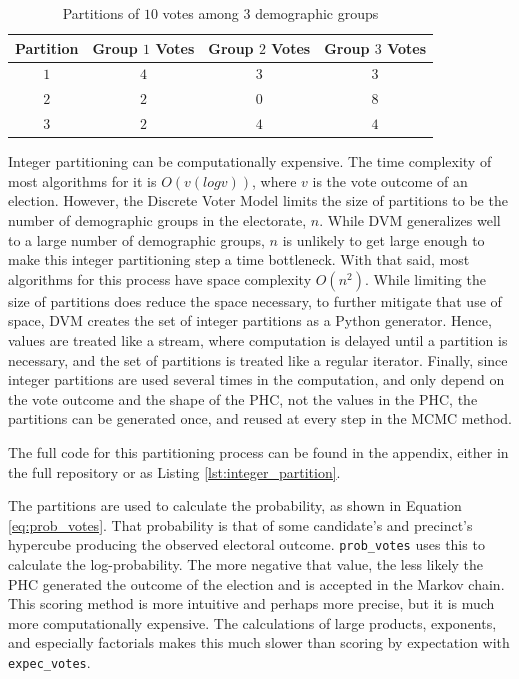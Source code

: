 \begin{table}[!h]
 \centering
 \caption{Partitions of $10$ votes among $3$ demographic groups}
 \label{table:partitions}
 \begin{tabular}{|c|c|c|c|}
   \toprule
    Partition & Group $1$ Votes & Group $2$ Votes & Group $3$ Votes \\\midrule
    $1$ & $4$ & $3$ & $3$  \\
    $2$ & $2$ & $0$ & $8$  \\
    $3$ & $2$ & $4$ & $4$  \\
    \bottomrule
 \end{tabular}
\end{table}

Integer partitioning can be computationally expensive. The time complexity of most algorithms for it is $O(v (log v))$, where $v$ is the vote outcome of an election. However, the Discrete Voter Model limits the size of partitions to be the number of demographic groups in the electorate, $n$. While DVM generalizes well to a large number of demographic groups, $n$ is unlikely to get large enough to make this integer partitioning step a time bottleneck. With that said, most algorithms for this process have space complexity $O(n^2)$. While limiting the size of partitions does reduce the space necessary, to further mitigate that use of space, DVM creates the set of integer partitions as a Python generator. Hence, values are treated like a stream, where computation is delayed until a partition is necessary, and the set of partitions is treated like a regular iterator. Finally, since integer partitions are used several times in the computation, and only depend on the vote outcome and the shape of the PHC, not the values in the PHC, the partitions can be generated once, and reused at every step in the MCMC method.

The full code for this partitioning process can be found in the appendix, either in the full repository or as Listing \ref{lst:integer_partition}.

The partitions are used to calculate the probability, as shown in Equation \ref{eq:prob_votes}. That probability is that of some candidate's and precinct's hypercube producing the observed electoral outcome. \texttt{prob\_votes} uses this to calculate the log-probability. The more negative that value, the less likely the PHC generated the outcome of the election and is accepted in the Markov chain. This scoring method is more intuitive and perhaps more precise, but it is much more computationally expensive. The calculations of large products, exponents, and especially factorials makes this much slower than scoring by expectation with \texttt{expec\_votes}.

